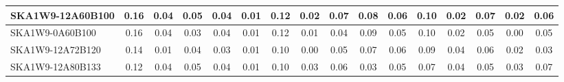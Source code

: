 \begin{table}[H]
{{\begin{tabular}{|lccccc||ccccc||ccccc|}
SKA1W9-12A60B100 & 0.16 \cellcolor{blue!60.00} & 0.04 \cellcolor{red!36.00} & 0.05 \cellcolor{green!46.00} & 0.04 \cellcolor{orange!60.00} & 0.01 \cellcolor{purple!18.00} & 0.12 \cellcolor{blue!46.00} & 0.02 \cellcolor{red!30.00} & 0.07 \cellcolor{green!60.00} & 0.08 \cellcolor{orange!53.00} & 0.06 \cellcolor{purple!60.00} & 0.10 \cellcolor{blue!60.00} & 0.02 \cellcolor{red!18.00} & 0.07 \cellcolor{green!60.00} & 0.02 \cellcolor{orange!46.00} & 0.06 \cellcolor{purple!43.20}\\ \hline 
SKA1W9-0A60B100 & 0.16 \cellcolor{blue!60.00} & 0.04 \cellcolor{red!36.00} & 0.03 \cellcolor{green!18.00} & 0.04 \cellcolor{orange!60.00} & 0.01 \cellcolor{purple!18.00} & 0.12 \cellcolor{blue!46.00} & 0.01 \cellcolor{red!24.00} & 0.04 \cellcolor{green!18.00} & 0.09 \cellcolor{orange!60.00} & 0.05 \cellcolor{purple!46.00} & 0.10 \cellcolor{blue!60.00} & 0.02 \cellcolor{red!18.00} & 0.05 \cellcolor{green!18.00} & 0.00 \cellcolor{orange!18.00} & 0.05 \cellcolor{purple!34.80}\\ \hline 
SKA1W9-12A72B120 & 0.14 \cellcolor{blue!43.20} & 0.01 \cellcolor{red!18.00} & 0.04 \cellcolor{green!32.00} & 0.03 \cellcolor{orange!39.00} & 0.01 \cellcolor{purple!18.00} & 0.10 \cellcolor{blue!18.00} & 0.00 \cellcolor{red!18.00} & 0.05 \cellcolor{green!32.00} & 0.07 \cellcolor{orange!46.00} & 0.06 \cellcolor{purple!60.00} & 0.09 \cellcolor{blue!49.50} & 0.04 \cellcolor{red!46.00} & 0.06 \cellcolor{green!39.00} & 0.02 \cellcolor{orange!46.00} & 0.03 \cellcolor{purple!18.00}\\ \hline 
SKA1W9-12A80B133 & 0.12 \cellcolor{blue!26.40} & 0.04 \cellcolor{red!36.00} & 0.05 \cellcolor{green!46.00} & 0.04 \cellcolor{orange!60.00} & 0.01 \cellcolor{purple!18.00} & 0.10 \cellcolor{blue!18.00} & 0.03 \cellcolor{red!36.00} & 0.06 \cellcolor{green!46.00} & 0.03 \cellcolor{orange!18.00} & 0.05 \cellcolor{purple!46.00} & 0.07 \cellcolor{blue!28.50} & 0.04 \cellcolor{red!46.00} & 0.05 \cellcolor{green!18.00} & 0.03 \cellcolor{orange!60.00} & 0.07 \cellcolor{purple!51.60}\\ \hline 
\end{tabular}}
\vspace{-0.300000cm}
\hspace{1cm} 
}
\end{table}
